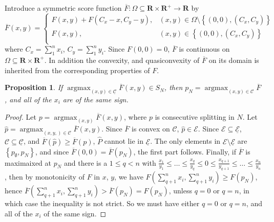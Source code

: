 \documentclass{article}
\newtheorem{prop}{Proposition}
\theoremstyle{case}
\DeclareMathOperator*{\argmax}{argmax} %
\begin{document}
Introduce a symmetric score function $\overline{F}\colon \Omega \subseteq \mathbf{R} \times \mathbf{R}^{+} \to \mathbf{R}$ by
\[   
\overline{F}\left( x,y\right) = \left\{
\begin{array}{ll}
      F\left( x,y\right) + F\left( C_x-x, C_y-y\right), & \left( x,y\right) \in \Omega \setminus{\left\lbrace \left( 0,0\right), \left( C_x, C_y\right) \right\rbrace}  \\
      F\left( x,y\right), & \left( x,y\right) \in \left\lbrace \left( 0,0\right), \left( C_x, C_y\right) \right\rbrace  \\
\end{array} 
\right. 
\]
where $C_x = \sum_1^n x_i$, $C_y = \sum_1^n y_i$. Since $F\left( 0,0\right) = 0$, $\overline{F}$ is continuous on $\Omega \subseteq \mathbf{R} \times \mathbf{R}^{+}$. In addition the convexity, and quasiconvexity of $\overline{F}$ on its domain is inherited from the corresponding properties of $F$. 

\begin{prop}
If $\argmax_{\left( x,y\right) \in \underline{\mathcal{C}}} \overline{F}\left( x,y\right) \in S_N$, then $p_N = \argmax_{\left( x,y\right) \in \mathcal{C}} \overline{F}$, and all of the $x_i$ are of the same sign.
\end{prop}
\begin{proof}
Let $p = \argmax_{\left( x,y\right)} \overline{F}\left( x,y\right)$, where $p$ is consecutive splitting in $N$. Let $\hat{p} = \argmax_{\left( x,y,\right) \in \mathcal{C}} \overline{F}\left( x,y\right)$. Since $\overline{F}$ is convex on $\mathcal{C}$, $\hat{p} \in \mathcal{E}$. Since $\mathcal{E} \subseteq \underline{\mathcal{E}}$, $\mathcal{C} \subseteq \underline{\mathcal{C}}$, and $\overline{F}\left( \hat{p}\right) \geq \overline{F}\left( p\right)$, $\hat{P}$ cannot lie in $\underline{\mathcal{E}}$. The only elements in $\mathcal{E}\setminus \underline{\mathcal{E}}$ are $\left\lbrace p_{\emptyset}, p_{N}\right\rbrace$, and since $\overline{F}\left( 0,0\right) = \overline{F}\left( p_N\right)$, the first part follows. Finally, if $\overline{F}$ is maximaixed at $p_N$ and there is a $1 \leq q < n$ with $\frac{x_1}{y_1} \leq \dots \leq \frac{x_q}{y_q} \leq 0 \leq \frac{x_{q+1}}{y_{q+1}} \leq \dots \leq \frac{x_n}{y_n}$, then by monotonicity of $F$ in $x$, $y$, we have $F\left( \sum_{q+1}^n x_i, \sum_{q+1}^n y_i\right) \geq F\left( p_N\right)$, hence $\overline{F}\left( \sum_{q+1}^n x_i, \sum_{q+1}^n y_i\right) > \overline{F}\left( p_N\right) = F\left( p_N\right)$, unless $q = 0$ or $q = n$, in which case the inequality is not strict. So we must have either $q = 0$ or $q = n$, and all of the $x_i$ of the same sign.
\end{proof}
\end{document}
